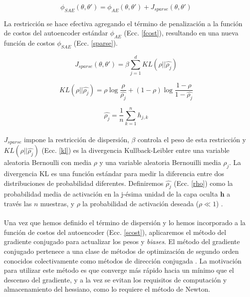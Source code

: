 \documentclass[12pt]{article}
\begin{document}
\begin{equation}
\label{sparse}
\phi_{SAE}(\theta,\theta')=\phi_{AE}(\theta,\theta')+J_{sparse}(\theta,\theta')
\end{equation}

La restricción se hace efectiva agregando el término de penalización a la función de costos del autoencoder estándar $\phi_{AE}$ (Ecc. \ref{fcost}), resultando en una nueva función de costos $\phi_{SAE}$ (Ecc. \ref{sparse}).

\begin{equation}
\label{spterm}
J_{sparse}(\theta,\theta')=\beta\sum_{j=1}^{d}KL(\rho||\hat{\rho_{j}})
\end{equation} 

\begin{equation}
\label{kl}
KL(\rho||\hat{\rho_{j}})={\rho} \log\frac{\rho}{\hat{\rho_{j}}}+(1-\rho)\log\frac{1-\rho}{1-\hat{\rho_{j}}}
\end{equation} 

\begin{equation}
\label{rho}
\hat{\rho_{j}}=\frac{1}{n}\sum_{k=1}^{n}h_{j,k}
\end{equation} 

\paragraph{}
$J_{sparse}$ impone la restricción de dispersión, $\beta$ controla el peso de esta restricción y $KL(\rho||\hat{\rho_{j}})$ (Ecc. \ref{kl}) es la divergencia Kullback-Leibler entre una variable aleatoria Bernoulli con media $\rho$ y una variable aleatoria Bernouilli media $\hat{\rho_{j}}$. La divergencia KL es una función estándar para medir la diferencia entre dos distribuciones de probabilidad diferentes. Definiremos $\hat{\rho_{j}}$ (Ecc. \ref{rho}) como la probabilidad media de activación en la j-ésima unidad de la capa oculta $\textbf{h}$ a través las $n$ muestras, y $\rho$ la probabilidad de activación deseada ($\rho\ll1$) \cite{song}. 

\paragraph{}
Una vez que hemos definido el término de dispersión y lo hemos incorporado a la función de costos del autoencoder (Ecc. \ref{scost}), aplicaremos el método del gradiente conjugado para actualizar los pesos y \textit{biases}. El método del gradiente conjugado pertenece a una clase de métodos de optimización de segundo orden conocidos colectivamente como métodos de dirección conjugada \cite{haykin}. La motivación para utilizar este método es que converge más rápido hacia un mínimo que el descenso del gradiente, y a la vez se evitan los requisitos de computación y almacenamiento del hessiano, como lo requiere el método de Newton.
\end{document}
